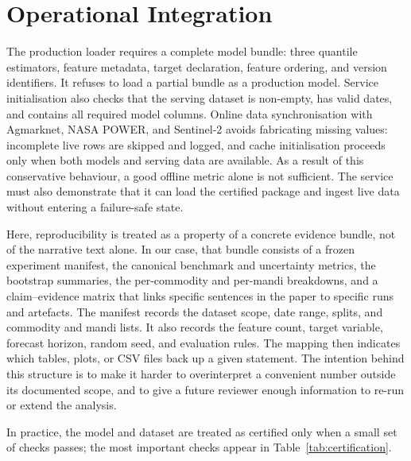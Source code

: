 \documentclass[a4paper,conference]{IEEEtran}
\begin{document}
\section{Operational Integration}
The production loader requires a complete model bundle: three quantile estimators, feature metadata, target declaration, feature ordering, and version identifiers. It refuses to load a partial bundle as a production model. Service initialisation also checks that the serving dataset is non-empty, has valid dates, and contains all required model columns. Online data synchronisation with Agmarknet, NASA POWER, and Sentinel-2 avoids fabricating missing values: incomplete live rows are skipped and logged, and cache initialisation proceeds only when both models and serving data are available. As a result of this conservative behaviour, a good offline metric alone is not sufficient. The service must also demonstrate that it can load the certified package and ingest live data without entering a failure-safe state.

Here, reproducibility is treated as a property of a concrete evidence bundle, not of the narrative text alone. In our case, that bundle consists of a frozen experiment manifest, the canonical benchmark and uncertainty metrics, the bootstrap summaries, the per-commodity and per-mandi breakdowns, and a claim--evidence matrix that links specific sentences in the paper to specific runs and artefacts. The manifest records the dataset scope, date range, splits, and commodity and mandi lists. It also records the feature count, target variable, forecast horizon, random seed, and evaluation rules. The mapping then indicates which tables, plots, or CSV files back up a given statement. The intention behind this structure is to make it harder to overinterpret a convenient number outside its documented scope, and to give a future reviewer enough information to re-run or extend the analysis.

In practice, the model and dataset are treated as certified only when a small set of checks passes; the most important checks appear in Table~\ref{tab:certification}.
\end{document}
